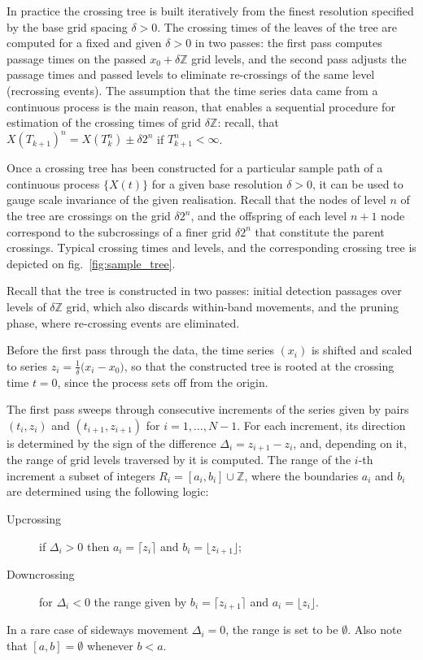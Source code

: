 \documentclass[a4paper]{article}
\begin{document}
In practice the crossing tree is built iteratively from the finest resolution
specified by the base grid spacing $\delta > 0$. The crossing times of the leaves
of the tree are computed for a fixed and given $\delta>0$ in two passes: the first
pass computes passage times on the passed $x_0+\delta \mathbb{Z}$ grid levels, and
the second pass adjusts the passage times and passed levels to eliminate re-crossings
of the same level (recrossing events). The assumption that the time series data
came from a continuous process is the main reason, that enables a sequential procedure
for estimation of the crossing times of grid $\delta\mathbb{Z}$: recall, that
$X(T_{k+1})^n = X(T_k^n) \pm\delta2^n$ if $T_{k+1}^n<\infty$.

Once a crossing tree has been constructed for a particular sample path of a continuous
process $\{X(t)\}$ for a given base resolution $\delta>0$, it can be used to gauge
scale invariance of the given realisation. Recall that the nodes of level $n$ of
the tree are crossings on the grid $\delta 2^n$, and the offspring of each level
$n+1$ node correspond to the subcrossings of a finer grid $\delta 2^n$ that constitute
the parent crossings. Typical crossing times and levels, and the corresponding crossing
tree is depicted on fig.~\ref{fig:sample_tree}.


Recall that the tree is constructed in two passes: initial detection passages over
levels of $\delta \mathbb{Z}$ grid, which also discards within-band movements, and
the pruning phase, where re-crossing events are eliminated.

Before the first pass through the data, the time series $(x_i)$ is shifted and scaled
to series $z_i = \frac{1}{ \delta }\bigl(x_i - x_0\bigr)$, so that the constructed
tree is rooted at the crossing time $t=0$, since the process sets off from the origin.

The first pass sweeps through consecutive increments of the series given by pairs
$(t_i, z_i)$ and $(t_{i+1}, z_{i+1})$ for $i=1, \ldots, N-1$. For each increment,
its direction is determined by the sign of the difference $\Delta_i=z_{i+1}-z_i$,
and, depending on it, the range of grid levels traversed by it is computed. The
range of the $i$-th increment a subset of integers $R_i = [a_i,b_i]\cup\mathbb{Z}$,
where the boundaries $a_i$ and $b_i$ are determined using the following logic:
\begin{description}
    \item[Upcrossing] if $\Delta_i > 0$ then $a_i = \lceil z_i \rceil$
    and $b_i = \lfloor z_{i+1}\rfloor$;
    \item[Downcrossing] for $\Delta_i < 0$ the range given by $b_i = \lceil z_{i+1} \rceil$
    and $a_i = \lfloor z_i\rfloor$.
\end{description}
In a rare case of sideways movement $\Delta_i = 0$, the range is set to be $\emptyset$.
Also note that $[a,b] = \emptyset$ whenever $b<a$.
\end{document}
